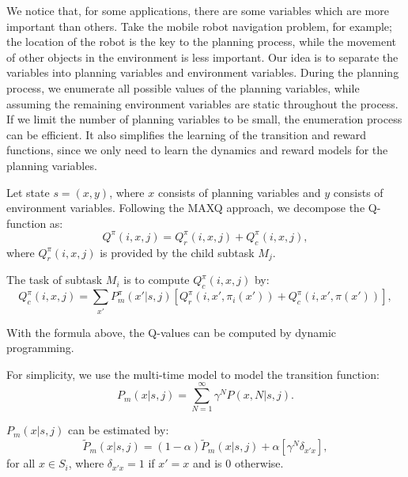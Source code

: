 We notice that, for some applications, there are some variables which are more important
than others. Take the mobile robot navigation problem, for example; the location of the robot 
is the key to the planning process, while the movement of other objects in the environment is less important.
Our idea is to separate the variables into planning variables 
and environment variables. During the planning process, we enumerate all possible values of the planning variables, while assuming 
the remaining environment variables are static throughout the process. 
If we limit the number of planning variables to be small, the enumeration process can be efficient.
It also simplifies the learning of the transition and reward functions, since we only need to learn
the dynamics and reward models for the planning variables.

Let state $s = (x, y)$, where $x$ consists of planning variables and $y$ consists of environment
variables. Following the MAXQ approach, we decompose the Q-function as:
\begin{equation}
    Q^{\pi}(i, x, j) = Q_r^{\pi}(i, x, j) + Q_c^{\pi}(i, x, j),
    \label{eq:biasedMaxQ}
\end{equation}
where $Q_r^{\pi}(i, x, j)$ is provided by the child subtask $M_j$.

The task of subtask $M_i$ is to compute $Q_c^{\pi}(i, x, j)$ by:
\begin{equation}
    Q_c^{\pi}(i, x, j) = \sum_{x'} P_m^{\pi}(x'|s, j)[Q_r^{\pi}(i, x', \pi_i(x')) + Q_c^{\pi}(i, x', \pi(x'))],
    \label{eq:biasedQc}
\end{equation}

With the formula above, the Q-values can be computed by dynamic programming.

For simplicity, we use the multi-time model \cite{SMDP} to model the transition function: 
\begin{equation}
    P_m(x|s, j) = \sum^{\infty}_{N=1} \gamma^N P(x, N|s, j).
    \label{eq:multiProb}
\end{equation}

$P_m(x|s, j)$ can be estimated by:
\begin{equation}
    \tilde{P}_m(x|s, j) = (1-\alpha)\tilde{P}_m(x|s, j) + \alpha [ \gamma^N \delta_{x'x}],
    \label{eq:approxP}
\end{equation}
for all $x \in S_i$, where $\delta_{x'x}=1$ if $x' = x$ and is 0 otherwise.

